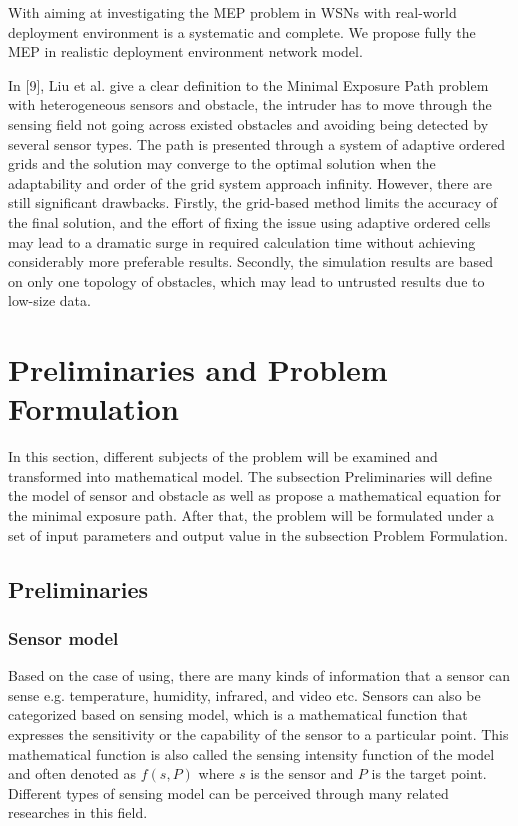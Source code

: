 \documentclass[final]{elsarticle}
\begin{document}
With aiming at investigating the MEP problem in WSNs with real-world deployment environment is a systematic and complete. We propose fully the MEP in realistic deployment environment network model. 

In [9], Liu et al. give a clear definition to the Minimal Exposure Path problem with heterogeneous sensors and obstacle, the intruder has to move through the sensing field not going across existed obstacles and avoiding being detected by several sensor types. The path is presented through a system of adaptive ordered grids and the solution may converge to the optimal solution when the adaptability and order of the grid system approach infinity. However, there are still significant drawbacks. Firstly, the grid-based method limits the accuracy of the final solution, and the effort of fixing the issue using adaptive ordered cells may lead to a dramatic surge in required calculation time without achieving considerably more preferable results. Secondly, the simulation results are based on only one topology of obstacles, which may lead to untrusted results due to low-size data.

\section{Preliminaries and Problem Formulation}

In this section, different subjects of the problem will be examined and transformed into mathematical model. The subsection Preliminaries will define the model of sensor and obstacle as well as propose a mathematical equation for the minimal exposure path. After that, the problem will be formulated under a set of input parameters and output value in the subsection Problem Formulation.

\subsection{Preliminaries}

\subsubsection{Sensor model}

Based on the case of using, there are many kinds of information that a sensor can sense e.g. temperature, humidity, infrared, and video etc. Sensors can also be categorized based on sensing model, which is a mathematical function that expresses the sensitivity or the capability of the sensor to a particular point. This mathematical function is also called the sensing intensity function of the model and often denoted as $f(s, P)$ where $ s $ is the sensor and $ P $ is the target point. Different types of sensing model can be perceived through many related researches in this field.
\end{document}
